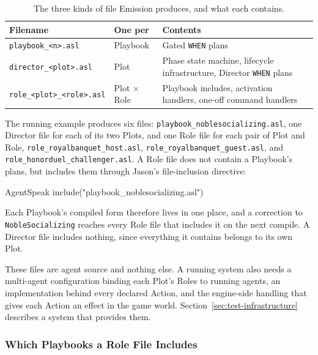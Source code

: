 \begin{table}[h]
\centering
\begin{tabular}{|l|l|p{6cm}|}
\hline
\textbf{Filename} & \textbf{One per} & \textbf{Contents} \\
\hline
\lstinline|playbook_<n>.asl| & Playbook & Gated \lstinline|WHEN| plans \\
\lstinline|director_<plot>.asl| & Plot & Phase state machine, lifecycle infrastructure, Director \lstinline|WHEN| plans \\
\lstinline|role_<plot>_<role>.asl| & Plot $\times$ Role & Playbook includes, activation handlers, one-off command handlers \\
\hline
\end{tabular}
\caption{The three kinds of file Emission produces, and what each contains.}
\label{tab:emission-files}
\end{table}
 
The running example produces six files: \lstinline|playbook_noblesocializing.asl|, one Director file for each of its two Plots, and one Role file for each pair of Plot and Role, \lstinline|role_royalbanquet_host.asl|, \lstinline|role_royalbanquet_guest.asl|, and \lstinline|role_honorduel_challenger.asl|. A Role file does not contain a Playbook's plans, but includes them through Jason's file-inclusion directive:
 
\begin{codeblock}[]{AgentSpeak}
{ include("playbook_noblesocializing.asl") }
\end{codeblock}
 
Each Playbook's compiled form therefore lives in one place, and a correction to \lstinline|NobleSocializing| reaches every Role file that includes it on the next compile. A Director file includes nothing, since everything it contains belongs to its own Plot.
 
These files are agent source and nothing else. A running system also needs a multi-agent configuration binding each Plot's Roles to running agents, an implementation behind every declared Action, and the engine-side handling that gives each Action an effect in the game world. Section~\ref{sec:test-infrastructure} describes a system that provides them.
 
\subsubsection{Which Playbooks a Role File Includes}
\label{sec:playbook-reachability}
 
